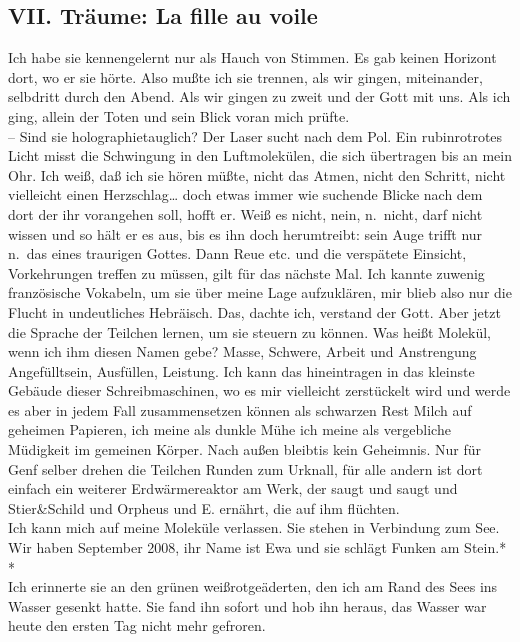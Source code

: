 \documentclass[
]{article}
\author{}
\date{\vspace{-2.5em}}
\begin{document}
\subsection{VII. Träume: La fille au
voile}\label{vii.-truxe4ume-la-fille-au-voile}

Ich habe sie kennengelernt nur als Hauch von Stimmen. Es gab keinen
Horizont dort, wo er sie hörte. Also mußte ich sie trennen, als wir
gingen, miteinander, selbdritt durch den Abend. Als wir gingen zu zweit
und der Gott mit uns. Als ich ging, allein der Toten und sein Blick
voran mich prüfte.\\
-- Sind sie holographietauglich? Der Laser sucht nach dem Pol. Ein
rubinrotrotes Licht misst die Schwingung in den Luftmolekülen, die sich
übertragen bis an mein Ohr. Ich weiß, daß ich sie hören müßte, nicht das
Atmen, nicht den Schritt, nicht vielleicht einen Herzschlag\ldots{} doch
etwas immer wie suchende Blicke nach dem dort der ihr vorangehen soll,
hofft er. Weiß es nicht, nein, n.~nicht, darf nicht wissen und so hält
er es aus, bis es ihn doch herumtreibt: sein Auge trifft nur n.~das
eines traurigen Gottes. Dann Reue etc. und die verspätete Einsicht,
Vorkehrungen treffen zu müssen, gilt für das nächste Mal. Ich kannte
zuwenig französische Vokabeln, um sie über meine Lage aufzuklären, mir
blieb also nur die Flucht in undeutliches Hebräisch. Das, dachte ich,
verstand der Gott. Aber jetzt die Sprache der Teilchen lernen, um sie
steuern zu können. Was heißt Molekül, wenn ich ihm diesen Namen gebe?
Masse, Schwere, Arbeit und Anstrengung Angefülltsein, Ausfüllen,
Leistung. Ich kann das hineintragen in das kleinste Gebäude dieser
Schreibmaschinen, wo es mir vielleicht zerstückelt wird und werde es
aber in jedem Fall zusammensetzen können als schwarzen Rest Milch auf
geheimen Papieren, ich meine als dunkle Mühe ich meine als vergebliche
Müdigkeit im gemeinen Körper. Nach außen bleibtis kein Geheimnis. Nur
für Genf selber drehen die Teilchen Runden zum Urknall, für alle andern
ist dort einfach ein weiterer Erdwärmereaktor am Werk, der saugt und
saugt und Stier\&Schild und Orpheus und E. ernährt, die auf ihm
flüchten.\\
Ich kann mich auf meine Moleküle verlassen. Sie stehen in Verbindung zum
See. Wir haben September 2008, ihr Name ist Ewa und sie schlägt Funken
am Stein.* *\\
Ich erinnerte sie an den grünen weißrotgeäderten, den ich am Rand des
Sees ins Wasser gesenkt hatte. Sie fand ihn sofort und hob ihn heraus,
das Wasser war heute den ersten Tag nicht mehr gefroren.\\
\end{document}
